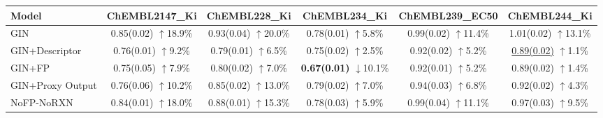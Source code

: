 \begin{table}[t]
\centering
\small
\setlength{\tabcolsep}{4pt}
\begin{tabular}{lccccc}
\hline
Model & ChEMBL2147\_Ki & ChEMBL228\_Ki & ChEMBL234\_Ki & ChEMBL239\_EC50 & ChEMBL244\_Ki \\
\hline
GIN & \shortstack{0.85(0.02)\\$\uparrow$18.9\%} & \shortstack{0.93(0.04)\\$\uparrow$20.0\%} & \shortstack{0.78(0.01)\\$\uparrow$5.8\%} & \shortstack{0.99(0.02)\\$\uparrow$11.4\%} & \shortstack{1.01(0.02)\\$\uparrow$13.1\%} \\

GIN+Descriptor & \shortstack{0.76(0.01)\\$\uparrow$9.2\%} & \shortstack{0.79(0.01)\\$\uparrow$6.5\%} & \shortstack{0.75(0.02)\\$\uparrow$2.5\%} & \shortstack{0.92(0.02)\\$\uparrow$5.2\%} & \shortstack{\underline{0.89(0.02)}\\$\uparrow$1.1\%} \\

GIN+FP & \shortstack{0.75(0.05)\\$\uparrow$7.9\%} & \shortstack{0.80(0.02)\\$\uparrow$7.0\%} & \shortstack{\textbf{0.67(0.01)}\\$\downarrow$10.1\%} & \shortstack{0.92(0.01)\\$\uparrow$5.2\%} & \shortstack{0.89(0.02)\\$\uparrow$1.4\%} \\

GIN+Proxy Output & \shortstack{0.76(0.06)\\$\uparrow$10.2\%} & \shortstack{0.85(0.02)\\$\uparrow$13.0\%} & \shortstack{0.79(0.02)\\$\uparrow$7.0\%} & \shortstack{0.94(0.03)\\$\uparrow$6.8\%} & \shortstack{0.92(0.02)\\$\uparrow$4.3\%} \\

NoFP-NoRXN & \shortstack{0.84(0.01)\\$\uparrow$18.0\%} & \shortstack{0.88(0.01)\\$\uparrow$15.3\%} & \shortstack{0.78(0.03)\\$\uparrow$5.9\%} & \shortstack{0.99(0.04)\\$\uparrow$11.1\%} & \shortstack{0.97(0.03)\\$\uparrow$9.5\%} \\


\end{tabular}
\end{table}
